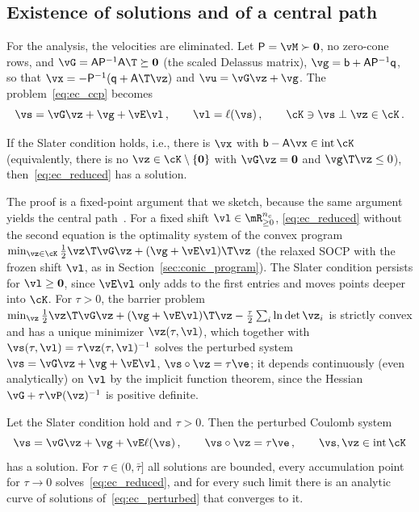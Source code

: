 \subsection{Existence of solutions and of a central path}\label{sec:ec_existence}
%
For the analysis, the velocities are eliminated. Let $\mathsf{P} = \vM \succ \mathbf{0}$, no zero-cone rows, and $\vG = \mathsf{A}\mathsf{P}^{-1}\mathsf{A}\T \succeq \mathbf{0}$ (the scaled Delassus matrix), $\vg = \mathsf{b} + \mathsf{A}\mathsf{P}^{-1}\mathsf{q}$, so that $\vx = -\mathsf{P}^{-1}(\mathsf{q} + \mathsf{A}\T\vz)$ and $\vu = \vG\vz + \vg$. The problem~\eqref{eq:ec_ccp} becomes
%
\begin{equation}\label{eq:ec_reduced}
	\vs = \vG\vz + \vg + \vE\vl \, , \qquad \vl = \ell(\vs) \, , \qquad \cK \ni \vs \perp \vz \in \cK \, .
\end{equation}
%
\begin{proposition}\label{prop:ec_existence}
	If the Slater condition holds, i.e., there is $\vx$ with $\mathsf{b} - \mathsf{A}\vx \in \operatorname{int}\cK$ (equivalently, there is no $\vz \in \cK \setminus \{\mathbf{0}\}$ with $\vG\vz = \mathbf{0}$ and $\vg\T\vz \leq 0$), then~\eqref{eq:ec_reduced} has a solution.
\end{proposition}
%
The proof is a fixed-point argument that we sketch, because the same argument yields the central path~\cite{Acary2026}. For a fixed shift $\vl \in \mR^{n_c}_{\geq 0}$, \eqref{eq:ec_reduced} without the second equation is the optimality system of the convex program $\min_{\vz \in \cK} \tfrac{1}{2}\vz\T\vG\vz + (\vg + \vE\vl)\T\vz$ (the relaxed SOCP with the frozen shift $\vl$, as in Section~\ref{sec:conic_program}). The Slater condition persists for $\vl \geq \mathbf{0}$, since $\vE\vl$ only adds to the first entries and moves points deeper into $\cK$. For $\tau > 0$, the barrier problem $\min_{\vz} \tfrac{1}{2}\vz\T\vG\vz + (\vg + \vE\vl)\T\vz - \tfrac{\tau}{2}\sum_i \ln\det\vz_i$ is strictly convex and has a unique minimizer $\vz(\tau, \vl)$, which together with $\vs(\tau, \vl) = \tau\vz(\tau, \vl)^{-1}$ solves the perturbed system $\vs = \vG\vz + \vg + \vE\vl$, $\vs\circ\vz = \tau\ve$; it depends continuously (even analytically) on $\vl$ by the implicit function theorem, since the Hessian $\vG + \tau\vP(\vz)^{-1}$ is positive definite.
%
\begin{proposition}\label{prop:ec_central_path}
	Let the Slater condition hold and $\tau > 0$. Then the perturbed Coulomb system
	\begin{equation}\label{eq:ec_perturbed}
		\vs = \vG\vz + \vg + \vE\ell(\vs) \, , \qquad \vs\circ\vz = \tau\ve \, , \qquad \vs, \vz \in \operatorname{int}\cK
	\end{equation}
	has a solution. For $\tau \in (0, \bar{\tau}]$ all solutions are bounded, every accumulation point for $\tau \to 0$ solves~\eqref{eq:ec_reduced}, and for every such limit there is an analytic curve of solutions of~\eqref{eq:ec_perturbed} that converges to it.
\end{proposition}
